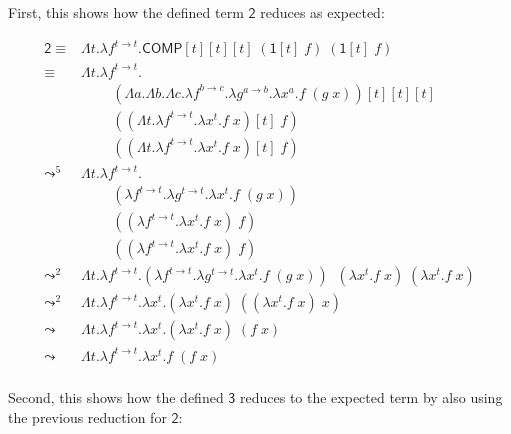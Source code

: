 \documentclass{article}
\begin{document}
First, this shows how the defined term $\mathsf{2}$ 
reduces as expected:

\begingroup
\allowdisplaybreaks
\begin{align*}
  \mathsf{2} 
    \equiv&
      \Lambda t.
      \lambda f^{t \rightarrow t}.
        \mathsf{COMP}[t][t][t]\;
        (\mathsf{1}[t]\;f)\;
        (\mathsf{1}[t]\;f) \\
    \equiv&
      \Lambda t.
      \lambda f^{t \rightarrow t}.
        \\&\;\;\;\;\;\;\;\;(\Lambda a. \Lambda b. \Lambda c. 
        \lambda f^{b \rightarrow c}.
        \lambda g^{a \rightarrow b}.
        \lambda x^a.
          f\;(g\;x))[t][t][t]\;
        \\&\;\;\;\;\;\;\;\;((
          \Lambda t. \lambda f^{t \rightarrow t}. \lambda x^t. f\;x
          )[t]\;f)\;
        \\&\;\;\;\;\;\;\;\;((\Lambda t. \lambda f^{t \rightarrow t}. \lambda x^t. f\;x)[t]\;f) \\
    \leadsto^{5}& 
      \Lambda t.
      \lambda f^{t \rightarrow t}.
        \\&\;\;\;\;\;\;\;\;(
        \lambda f^{t \rightarrow t}.
        \lambda g^{t \rightarrow t}.
        \lambda x^t.
          f\;(g\;x))\;
        \\&\;\;\;\;\;\;\;\;((
          \lambda f^{t \rightarrow t}. \lambda x^t. f\;x
          )\;f)\;
        \\&\;\;\;\;\;\;\;\;((\lambda f^{t \rightarrow t}. 
          \lambda x^t. f\;x)\;f) \\
    \leadsto^{2}& 
      \Lambda t.
      \lambda f^{t \rightarrow t}.
        (
        \lambda f^{t \rightarrow t}.
        \lambda g^{t \rightarrow t}.
        \lambda x^t.
          f\;(g\;x))\;
        \;(\lambda x^t. f\;x)
        \;(\lambda x^t. f\;x) \\
    \leadsto^{2}& 
      \Lambda t.
      \lambda f^{t \rightarrow t}.
        \lambda x^t.
        (\lambda x^t. f\;x)\;((\lambda x^t. f\;x)\;x)
      \\
    \leadsto& 
      \Lambda t.
      \lambda f^{t \rightarrow t}.
        \lambda x^t.
        (\lambda x^t. f\;x)\;(f\;x)
      \\
    \leadsto& 
      \Lambda t.
      \lambda f^{t \rightarrow t}.
        \lambda x^t. f\;(f\;x)
      \\
\end{align*}
\endgroup

Second, this shows how the defined $\mathsf{3}$ 
reduces to the expected term by also using the previous 
reduction for $\mathsf{2}$:
\end{document}
